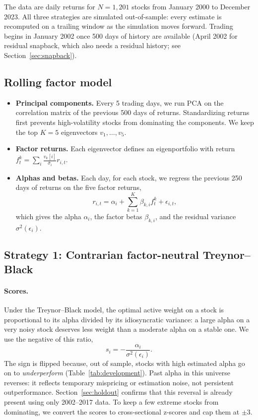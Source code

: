 \documentclass[11pt,letterpaper]{article}
\begin{document}
The data are daily returns for $N = 1{,}201$ stocks from January 2000 to December 2023. All
three strategies are simulated out-of-sample: every estimate is recomputed on a trailing window
as the simulation moves forward. Trading begins in January 2002 once 500 days of history are
available (April 2002 for residual snapback, which also needs a residual history; see
Section~\ref{sec:snapback}).

\subsection{Rolling factor model}

\begin{itemize}
    \item \textbf{Principal components.} Every 5 trading days, we run PCA on the correlation
    matrix of the previous 500 days of returns. Standardizing returns first prevents
    high-volatility stocks from dominating the components. We keep the top $K = 5$ eigenvectors
    $v_1, \dots, v_5$.
    \item \textbf{Factor returns.} Each eigenvector defines an eigenportfolio with return $f^k_t
    = \sum_i \frac{v_k[i]}{\bar\sigma_i} r_{i,t}$.
    \item \textbf{Alphas and betas.} Each day, for each stock, we regress the previous 250 days
    of returns on the five factor returns,
    \[
        r_{i,t} = \alpha_i + \sum_{k=1}^{K} \beta_{k,i} f^k_t + \epsilon_{i,t},
    \]
    which gives the alpha $\alpha_i$, the factor betas $\beta_{k,i}$, and the residual variance
    $\sigma^2(\epsilon_i)$.
\end{itemize}

\subsection{Strategy 1: Contrarian factor-neutral Treynor--Black}

\paragraph{Scores.} Under the Treynor--Black model, the optimal active weight on a stock is
proportional to its alpha divided by its idiosyncratic variance: a large alpha on a very noisy
stock deserves less weight than a moderate alpha on a stable one. We use the negative of this
ratio,
\[
    s_i = -\frac{\alpha_i}{\sigma^2(\epsilon_i)}.
\]
The sign is flipped because, out of sample, stocks with high estimated alpha go on to
\emph{underperform} (Table~\ref{tab:development}). Past alpha in this universe reverses: it
reflects temporary mispricing or estimation noise, not persistent outperformance.
Section~\ref{sec:holdout} confirms that this reversal is already present using only 2002--2017
data. To keep a few extreme stocks from dominating, we convert the scores to cross-sectional
z-scores and cap them at $\pm 3$.
\end{document}
